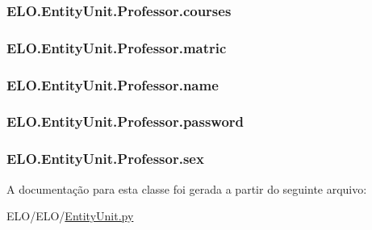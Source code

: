 \hypertarget{classELO_1_1EntityUnit_1_1Professor_a6eb0d2789bb8750fb275aca0f8bb74bb}{
\subsubsection[{courses}]{\setlength{\rightskip}{0pt plus 5cm}E\-L\-O.\-Entity\-Unit.\-Professor.\-courses}}\label{d5/df1/classELO_1_1EntityUnit_1_1Professor_a6eb0d2789bb8750fb275aca0f8bb74bb}
\hypertarget{classELO_1_1EntityUnit_1_1Professor_afc64d3f1b0e7c88530c7ee62f67ef671}{
\subsubsection[{matric}]{\setlength{\rightskip}{0pt plus 5cm}E\-L\-O.\-Entity\-Unit.\-Professor.\-matric}}\label{d5/df1/classELO_1_1EntityUnit_1_1Professor_afc64d3f1b0e7c88530c7ee62f67ef671}
\hypertarget{classELO_1_1EntityUnit_1_1Professor_ae85cc0fc9c64a277111a85e87efbe049}{
\subsubsection[{name}]{\setlength{\rightskip}{0pt plus 5cm}E\-L\-O.\-Entity\-Unit.\-Professor.\-name}}\label{d5/df1/classELO_1_1EntityUnit_1_1Professor_ae85cc0fc9c64a277111a85e87efbe049}
\hypertarget{classELO_1_1EntityUnit_1_1Professor_af0810854479e9f9a806eb6bfe7468e60}{
\subsubsection[{password}]{\setlength{\rightskip}{0pt plus 5cm}E\-L\-O.\-Entity\-Unit.\-Professor.\-password}}\label{d5/df1/classELO_1_1EntityUnit_1_1Professor_af0810854479e9f9a806eb6bfe7468e60}
\hypertarget{classELO_1_1EntityUnit_1_1Professor_ac049dc360c4af27037158e33577288e1}{
\subsubsection[{sex}]{\setlength{\rightskip}{0pt plus 5cm}E\-L\-O.\-Entity\-Unit.\-Professor.\-sex}}\label{d5/df1/classELO_1_1EntityUnit_1_1Professor_ac049dc360c4af27037158e33577288e1}


A documentação para esta classe foi gerada a partir do seguinte arquivo\-:\begin{DoxyCompactItemize}
\item 
E\-L\-O/\-E\-L\-O/\hyperlink{EntityUnit_8py}{Entity\-Unit.\-py}\end{DoxyCompactItemize}

